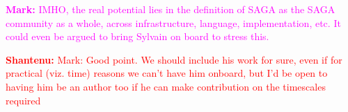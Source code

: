 \documentclass{article}
\newcommand{\B}[1]{\textbf{#1}}
\newcommand{\todo}[1]{{\textcolor{red}{\B{TODO:} #1 }}}
\newcommand{\jhanote}[1]{{\textcolor{red}{     \B{Shantenu:} #1 }}}
\newcommand{\msnote}[1]{{\textcolor{magenta}{ \B{Mark:    } #1 }}}
\newcommand{\todo}[1]{}
\newcommand{\jhanote}[1]{}
\newcommand{\msnote}[1]{}
\begin{document}
 \msnote{IMHO, the real potential lies in the definition of SAGA as the SAGA
 community as a whole, across infrastructure, language, implementation, etc.  It
 could even be argued to bring Sylvain on board to stress this.}

 \jhanote{Mark: Good point. We should include his work for sure, even if for
 practical (viz. time) reasons we can't have him onboard, but I'd be open to
 having him be an author too if he can make contribution on the timescales
 required}


% 
% 
% 
% 
% 
% 
% 
%  
\end{document}
